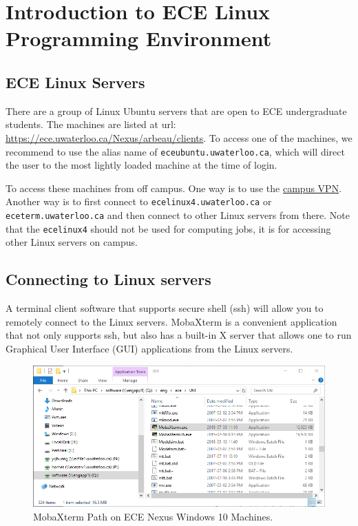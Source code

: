 \chapter{Introduction to ECE Linux Programming Environment}
\label{ch_linux_env}

\section{ECE Linux Servers}

There are a group of Linux Ubuntu servers that are open to ECE undergraduate students. The machines are listed at url: \url{https://ece.uwaterloo.ca/Nexus/arbeau/clients}. To access one of the machines, we recommend to use the alias name of \verb+eceubuntu.uwaterloo.ca+, which will direct the user to the most lightly loaded machine at the time of login.

To access these machines from off campus. One way is to use the \href{https://uwaterloo.ca/information-systems-technology/services/virtual-private-network-vpn}{campus VPN}.
Another way is to first connect to \verb+ecelinux4.uwaterloo.ca+ or \verb+eceterm.uwaterloo.ca+ and then connect to other Linux servers from there. Note that the \verb+ecelinux4+ should not be used for computing jobs, it is for accessing other Linux servers on campus.

\section{Connecting to Linux servers}

A terminal client software that supports secure shell (ssh) will allow you to remotely connect to the Linux servers. MobaXterm is a convenient application that not only supports ssh, but also has a built-in X server that allows one to run Graphical User Interface (GUI) applications from the Linux servers.
\begin{figure}[!htb]
  \centering
  \includegraphics[width=5.5in]{img/lab0/MobaXterm/MobaXterm_Path}
  \caption{MobaXterm Path on ECE Nexus Windows 10 Machines.}
  \label{fig_MobaXterm_Path}
\end{figure}

